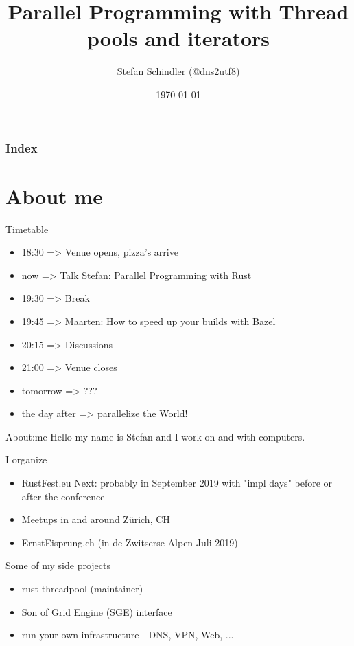 \documentclass[aspectratio=1610,t]{beamer}
\title{Parallel Programming with Thread pools and iterators}
\date{\today}
\author{Stefan Schindler (@dns2utf8)}
\institute{Rust Zürichsee, Schweiz, CH - hosted by Cloud Solutions Amsterdam, NL}
\begin{document}

\maketitle


\begin{frame}
	\frametitle{Index}
	\setcounter{tocdepth}{1}
	\tableofcontents
\end{frame}



{
\section{About me}
}

\begin{frame}[fragile]{Timetable}
  \begin{itemize}
    \item 18:30 => Venue opens, pizza's arrive
    \item now => Talk Stefan: Parallel Programming with Rust
    \item 19:30 => Break
    \item 19:45 => Maarten: How to speed up your builds with Bazel
    \item 20:15 => Discussions
    \item 21:00 => Venue closes
    \item tomorrow => ???
    \item the day after => parallelize the World!
  \end{itemize}
\end{frame}


\begin{frame}[fragile]{About:me}
Hello my name is Stefan and I work on and with computers.

I organize
\begin{itemize}
  \item RustFest.eu Next: probably in September 2019 with "impl days" before or after the conference
  \item Meetups in and around Zürich, CH
  \item ErnstEisprung.ch (in de Zwitserse Alpen Juli 2019)
\end{itemize}

Some of my side projects
\begin{itemize}
  \item rust threadpool (maintainer)
  \item Son of Grid Engine (SGE) interface
  \item run your own infrastructure - DNS, VPN, Web, ...
\end{itemize}
\end{frame}
\end{document}
